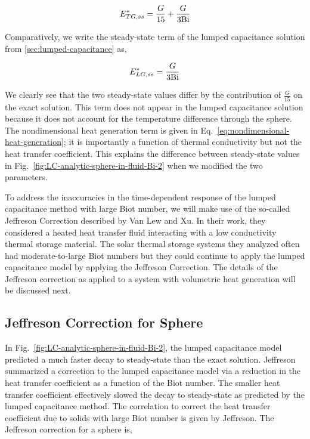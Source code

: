 \begin{equation}
	E^*_{TG,ss}=\frac{G}{15}+\frac{G}{3\mathrm{Bi}}
\end{equation}

Comparatively, we write the steady-state term of the lumped capacitance solution from \cref{sec:lumped-capacitance} as,

\begin{equation}
	E^*_{LG,ss} = \frac{G}{3\mathrm{Bi}}
\end{equation}

We clearly see that the two steady-state values differ by the contribution of $\frac{G}{15}$ on the exact solution. This term does not appear in the lumped capacitance solution because it does not account for the temperature difference through the sphere. The nondimensional heat generation term is given in Eq.~\ref{eq:nondimensional-heat-generation}; it is importantly a function of thermal conductivity but not the heat transfer coefficient. This explains the difference between steady-state values in Fig.~\ref{fig:LC-analytic-sphere-in-fluid-Bi-2} when we modified the two parameters.

To address the inaccuracies in the time-dependent response of the lumped capacitance method with large Biot number, we will make use of the so-called Jeffreson Correction described by Van Lew\cite{VanLew2010} and Xu\etal\cite{Xu2012}. In their work, they considered a heated heat transfer fluid interacting with a low conductivity thermal storage material. The solar thermal storage systems they analyzed often had moderate-to-large Biot numbers but they could continue to apply the lumped capacitance model by applying the Jeffreson Correction\cite{jeffreson409}. The details of the Jeffreson correction as applied to a system with volumetric heat generation will be discussed next.





\subsection{Jeffreson Correction for Sphere}
In Fig.~\ref{fig:LC-analytic-sphere-in-fluid-Bi-2}, the lumped capacitance model predicted a much faster decay to steady-state than the exact solution. Jeffreson summarized a correction to the lumped capacitance model via a reduction in the heat transfer coefficient as a function of the Biot number. The smaller heat transfer coefficient effectively slowed the decay to steady-state as predicted by the lumped capacitance method.
The correlation to correct the heat transfer coefficient due to solids with large Biot number is given by Jeffreson\cite{jeffreson409}. The Jeffreson correction for a sphere is,

